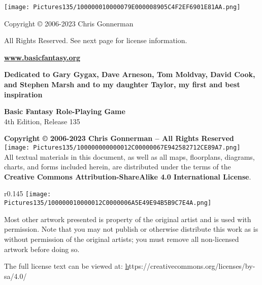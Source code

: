 \documentclass[a4paper,twoside,openany,10pt]{book}
\begin{document}
	
\justifying
\thispagestyle{empty}

\begin{center}
\texttt{[image: Pictures135/100000010000079E000008905C4F2EF6901E81AA.png]}
\end{center}

\begin{center}

{{\huge Copyright © 2006-2023 Chris Gonnerman}}\bigskip

{\LARGE All Rights Reserved. See next page for license information}.\bigskip

{\LARGE \href{https://www.basicfantasy.org}{\textbf{www.basicfantasy.org}}}\bigskip
 
\end{center}

\pagebreak

\thispagestyle{empty}

\begin{center}
\textbf{Dedicated to Gary Gygax, Dave Arneson, Tom Moldvay, David Cook, and Stephen Marsh and to my daughter Taylor, my first and best inspiration}
\end{center}

\addvspace{1.5cm}

{\large \textbf{Basic Fantasy Role-Playing Game}}\\

{\large 4th Edition, Release 135}

\textbf{Copyright © 2006-2023 Chris Gonnerman -- All Rights Reserved}
\hfill
\texttt{[image: Pictures135/100000000000012C00000067E942582712CE89A7.png]}\\

All textual materials in this document, as well as all maps, floorplans, diagrams, charts, and forms included herein, are distributed under the terms of the \textbf{Creative Commons Attribution-ShareAlike 4.0 International License}.
\begin{wrapfigure}{r}{0.145\textwidth}
	\texttt{[image: Pictures135/100000010000012C0000006A5E49E94B5B9C7E4A.png]}
\end{wrapfigure}

Most other artwork presented is property of the original artist and is used with permission. Note that you may not publish or otherwise distribute this work as is without permission of the original artists; you must remove all non-licensed artwork before doing so.

The full license text can be viewed at:  \href{https://creativecommons.org/licenses/by-sa/4.0/} https://creativecommons.org/licenses/by-sa/4.0/\\
\end{document}
